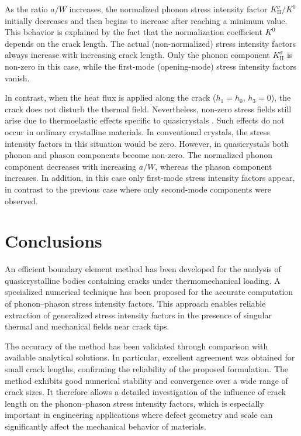 As the ratio $a/W$ increases, the normalized phonon stress intensity
factor $K_{\mathrm{II}}^{\sigma}/K^{0}$ initially decreases and then
begins to increase after reaching a minimum value. This behavior is
explained by the fact that the normalization coefficient $K^{0}$
depends on the crack length. The actual (non-normalized) stress
intensity factors always increase with increasing crack length.
Only the phonon component $K_{\mathrm{II}}^{\sigma}$ is non-zero in
this case, while the first-mode (opening-mode) stress intensity
factors vanish.

In contrast, when the heat flux is applied along the crack
($h_{1}=h_{0}$, $h_{3}=0$), the crack does not disturb the thermal
field. Nevertheless, non-zero stress fields still arise due to
thermoelastic effects specific to quasicrystals
\cite{Kushnir43}. Such effects do not occur in ordinary crystalline
materials. In conventional crystals, the stress intensity factors
in this situation would be zero. However, in quasicrystals both
phonon and phason components become non-zero. The normalized phonon
component decreases with increasing $a/W$, whereas the phason
component increases. In addition, in this case only first-mode
stress intensity factors appear, in contrast to the previous case
where only second-mode components were observed.

\section{Conclusions}

An efficient boundary element method has been developed for the analysis
of quasicrystalline bodies containing cracks under thermomechanical
loading. A specialized numerical technique has been proposed for the
accurate computation of phonon--phason stress intensity factors. This
approach enables reliable extraction of generalized stress intensity
factors in the presence of singular thermal and mechanical fields near
crack tips.

The accuracy of the method has been validated through comparison with
available analytical solutions. In particular, excellent agreement was
obtained for small crack lengths, confirming the reliability of the
proposed formulation. The method exhibits good numerical stability and
convergence over a wide range of crack sizes. It therefore allows a
detailed investigation of the influence of crack length on the
phonon--phason stress intensity factors, which is especially important
in engineering applications where defect geometry and scale can
significantly affect the mechanical behavior of materials.

